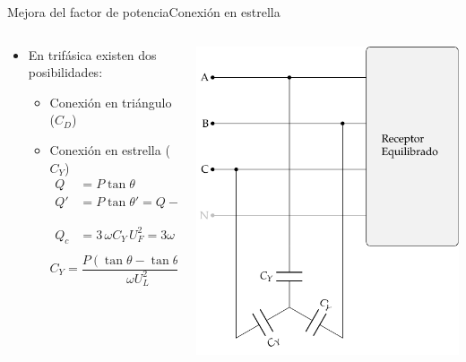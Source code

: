\documentclass[aspectratio=169, xcolor={usenames,svgnames,dvipsnames}]{beamer}
\begin{document}
\begin{frame}{Mejora del factor de potencia}{Conexión en estrella}
\begin{columns}
\begin{column}{0.5\linewidth}
\begin{itemize}
\item En trifásica existen dos posibilidades:
\begin{itemize}
\item Conexión en triángulo (\(C_D\))
\item Conexión en estrella (\(C_Y\))
\begin{align*}
  Q &= P\tan\theta\\
  Q' &= P\tan\theta' = Q - Q_c\\
  Q_c &= 3 \, \omega C_Y \, U_F^2 = {3} \omega \,C_Y \left(\dfrac{U_L}{\sqrt{3}}\right)^2=\omega C_Y \, U_L^2
\end{align*}
\[
  \boxed{C_Y = \frac{P(\tan \theta - \tan \theta')}{\omega U_L^2}}
\]
\end{itemize}
\end{itemize}
\end{column}
\begin{column}{0.5\linewidth}
\begin{center}
\includegraphics[width=.9\linewidth]{../figs/CircuitoTrifasicaY_CompensacionReactiva.pdf}
\end{center}
\end{column}
\end{columns}
\end{frame}
\end{document}
